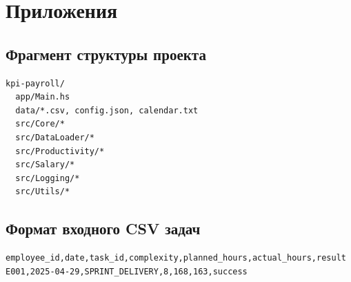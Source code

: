 \documentclass[a4paper,14pt]{extarticle}
\begin{document}
\appendix
\section{Приложения}

\subsection{Фрагмент структуры проекта}
\begin{lstlisting}[language=bash]
kpi-payroll/
  app/Main.hs
  data/*.csv, config.json, calendar.txt
  src/Core/*
  src/DataLoader/*
  src/Productivity/*
  src/Salary/*
  src/Logging/*
  src/Utils/*
\end{lstlisting}

\subsection{Формат входного CSV задач}
\begin{lstlisting}
employee_id,date,task_id,complexity,planned_hours,actual_hours,result
E001,2025-04-29,SPRINT_DELIVERY,8,168,163,success
\end{lstlisting}
\end{document}
